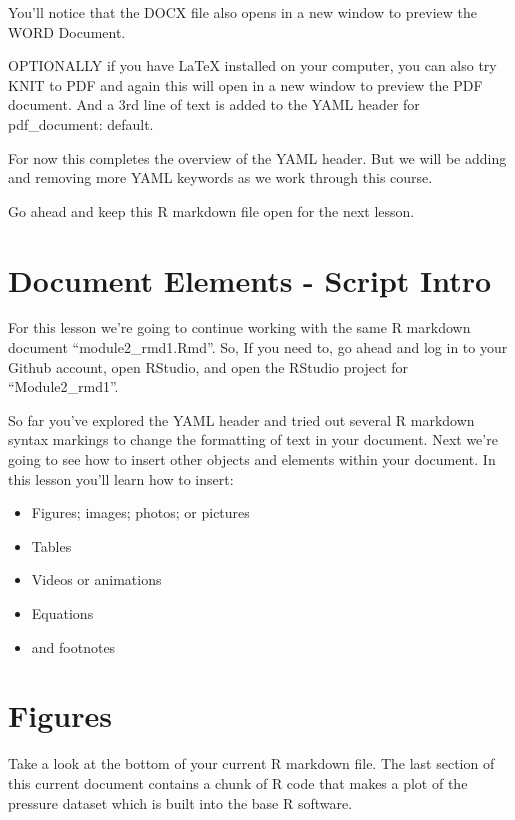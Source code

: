 \documentclass[
]{book}
\providecommand{\tightlist}{%
  \setlength{\itemsep}{0pt}\setlength{\parskip}{0pt}}
\begin{document}
You'll notice that the DOCX file also opens in a new window to preview the WORD Document.

OPTIONALLY if you have LaTeX installed on your computer, you can also try KNIT to PDF and again this will open in a new window to preview the PDF document. And a 3rd line of text is added to the YAML header for pdf\_document: default.

For now this completes the overview of the YAML header. But we will be adding and removing more YAML keywords as we work through this course.

Go ahead and keep this R markdown file open for the next lesson.

\hypertarget{document-elements---script-intro}{%
\section{Document Elements - Script Intro}\label{document-elements---script-intro}}

For this lesson we're going to continue working with the same R markdown document ``module2\_rmd1.Rmd''. So, If you need to, go ahead and log in to your Github account, open RStudio, and open the RStudio project for ``Module2\_rmd1''.

So far you've explored the YAML header and tried out several R markdown syntax markings to change the formatting of text in your document. Next we're going to see how to insert other objects and elements within your document. In this lesson you'll learn how to insert:

\begin{itemize}
\tightlist
\item
  Figures; images; photos; or pictures
\item
  Tables
\item
  Videos or animations
\item
  Equations
\item
  and footnotes
\end{itemize}

\hypertarget{figures}{%
\section{Figures}\label{figures}}

Take a look at the bottom of your current R markdown file. The last section of this current document contains a chunk of R code that makes a plot of the pressure dataset which is built into the base R software.
\end{document}
